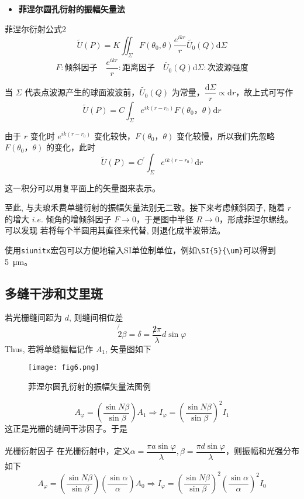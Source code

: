\begin{itemize} 
	\item \textbf{菲涅尔圆孔衍射的振幅矢量法}
\end{itemize}
\begin{mythm}{菲涅尔衍射公式}{2}
	\[
		\widetilde{U}(P)=K\iint_{\Sigma}{F\left( \theta _0,\theta \right) \frac{e^{ikr}}{r}\widetilde{U_0}(Q)\mathrm{d}\Sigma}
	\]
	\[
	F: \text{倾斜因子} \quad   \frac{e^{ikr}}{r}: \text{距离因子}\quad  \widetilde{U_0}(Q) \mathrm{d}\Sigma : \text{次波源强度}
	\]
\end{mythm}
\par 当 $\Sigma$ 代表点波源产生的球面波波前，$\widetilde{U_0}(Q)$ 为常量，$\dfrac{\mathrm{d} \Sigma}{r} \propto \mathrm{d} r$，故上式可写作
\[
\widetilde{U}(P)=C \int_{\Sigma} e^{i k\left(r-r_0\right)} F\left(\theta_0，\theta\right) \mathrm{d} r
\]
\par 由于 $r$ 变化时 $e^{i k\left(r-r_0\right)}$ 变化较快，$F\left(\theta_0，\theta\right)$ 变化较慢，所以我们先忽略 $F\left(\theta_0，\theta\right)$ 的变化，此时
\[
\widetilde{U}(P)=C^{\prime} \int_{\Sigma} e^{i k\left(r-r_0\right)} \mathrm{d} r
\]
\par 这一积分可以用复平面上的矢量图来表示。
\par

\par 至此, 与夫琅禾费单缝衍射的振幅矢量法别无二致。接下来考虑倾斜因子, 随着 $r$ 的增大 $i.e$.
倾角的增倾斜因子 $F \rightarrow 0$，于是图中半径 $R \rightarrow 0$，形成菲涅尔螺线。 可以发现 若将每个半圆用其直径来代替, 则退化成半波带法。


使用\verb+siunitx+宏包可以方便地输入SI单位制单位，例如\verb+\SI{5}{\um}+可以得到\SI{5}{\um}。

\subsection{多缝干涉和艾里斑}
若光栅缝间距为 $d$, 则缝间相位差
$$
\not{2} \beta=\delta=\frac{\not 2 \pi}{\lambda} d \sin \varphi
$$
Thus, 若将单缝振幅记作 $A_1$, 矢量图如下
\begin{figure}[!htp]
	\centering
	\texttt{[image: fig6.png]}
	\caption{菲涅尔圆孔衍射的振幅矢量法图例}
\end{figure}
$$
A_{\varphi}=\left(\frac{\sin N \beta}{\sin \beta}\right) A_1 \Rightarrow I_{\varphi}=\left(\frac{\sin N \beta}{\sin \beta}\right)^2 I_1
$$
这正是光栅的缝间干涉因子。于是
\begin{myprop}{ 光栅衍射因子}{}
	在光栅衍射中，定义$\alpha=\dfrac{\pi a\sin \varphi}{\lambda},\beta=\dfrac{\pi d\sin \varphi}{\lambda}$，则振幅和光强分布如下
	\[
		A_{\varphi}=\left(\frac{\sin N \beta}{\sin \beta}\right)\left(\frac{\sin \alpha}{\alpha}\right) A_0 \Rightarrow I_{\varphi}=\left(\frac{\sin N \beta}{\sin \beta}\right)^2\left(\frac{\sin \alpha}{\alpha}\right)^2 I_0
	\]
\end{myprop}

